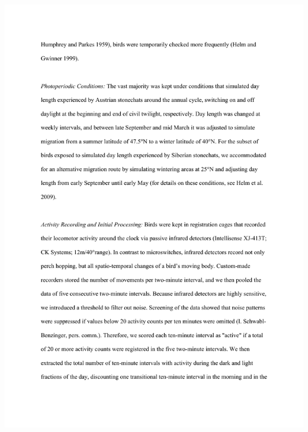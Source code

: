 \documentclass[a4paper, twoside]{templates/ociamthesis}
\begin{document}
\includegraphics[width=1\linewidth]{pdf_chapters/zug/zug_supp_crop_Part3}
\end{document}
